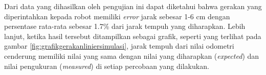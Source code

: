 

Dari data yang dihasilkan oleh pengujian ini dapat diketahui bahwa gerakan yang diperintahkan kepada robot memiliki \emph{error} jarak sebesar 1-6 cm dengan persentase rata-rata sebesar 1.7\% dari jarak tempuh yang diharapkan.
Lebih lanjut, ketika hasil tersebut ditampilkan sebagai grafik,
  seperti yang terlihat pada gambar \ref{fig:grafikgerakanliniersimulasi},
  jarak tempuh dari nilai odometri cenderung memiliki nilai yang sama dengan nilai yang diharapkan (\emph{expected}) dan nilai pengukuran (\emph{measured}) di setiap percobaan yang dilakukan.
